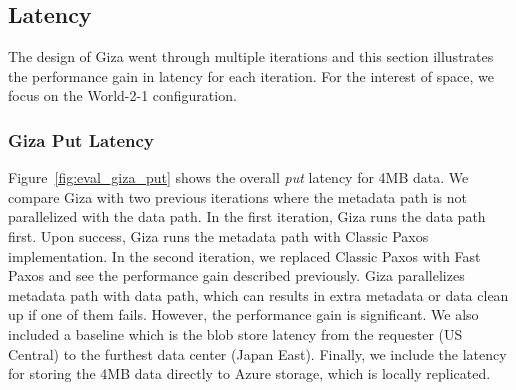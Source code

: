 


\subsection{\name Latency}

The design of Giza went through multiple iterations and this section illustrates the performance gain in latency for each iteration. For the interest of space, we focus on the World-2-1 configuration.

\subsubsection{Giza Put Latency}


Figure~\ref{fig:eval_giza_put} shows the \name overall {\em put} latency for 4MB data. We compare Giza with two previous iterations where the metadata path is not parallelized with the data path. In the first iteration, Giza runs the data path first. Upon success, Giza runs the metadata path with Classic Paxos implementation. In the second iteration, we replaced Classic Paxos with Fast Paxos and see the performance gain described previously. Giza parallelizes metadata path with data path, which can results in extra metadata or data clean up if one of them fails. However, the performance gain is significant. We also included a baseline which is the blob store latency from the requester (US Central) to the furthest data center (Japan East). Finally, we include the latency for storing the 4MB data directly to Azure storage, which is locally replicated.

